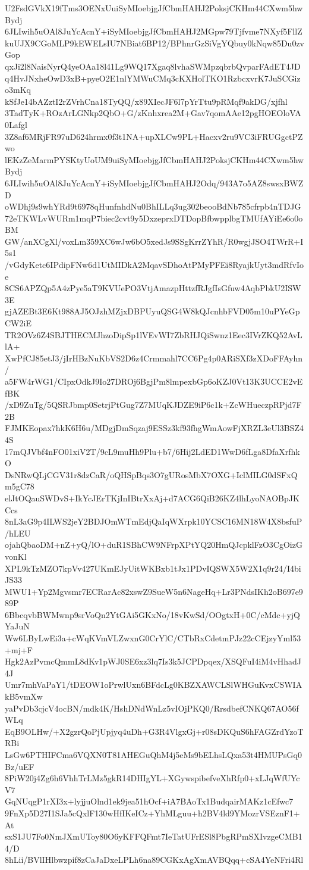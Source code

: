 U2FsdGVkX19fTms3OENxUuiSyMIoebjgJfCbmHAHJ2PoksjCKHm44CXwm5hwBydj
6JLIwih5uOAl8JuYcAcnY+iSyMIoebjgJfCbmHAHJ2MGpw79Tjfvme7NXyf5FllZ
kuUJX9CGoMLP9kEWELsIU7NBiat6BP12/BPhnrGzSiVgYQbuy0kNqw85Du0zvGop
qxJi2l8NaisNyrQ4yeOAa18l41Lg9WQ17Xgaq8lvhaSWMpzqbrbQvparFAdET4JD
q4HvJNxheOwD3xB+pyeO2E1nlYMWuCMq3cKXHolTKO1RzbcxvrK7JuSCGizo3mKq
kSfJe14bAZztI2rZVrhCna18TyQQ/x89XIecJF6l7pYrTtu9pRMqf9akDG/xjfhl
3TadTyK+ROzArLGNkp2QbO+G/zKnhxrea2M+Gav7qomAAe12pgHOEOloVA0Lafgl
3Z8af6MRjFR97uD624hrmx0f3t1NA+upXLCw9PL+Hacxv2ru9VC3iFRUGgctPZwo
lEKzZeMarmPYSKtyUoUM9uiSyMIoebjgJfCbmHAHJ2PoksjCKHm44CXwm5hwBydj
6JLIwih5uOAl8JuYcAcnY+iSyMIoebjgJfCbmHAHJ2Odq/943A7o5AZ8swsxBWZD
oWDhj9s9whYRd9t6978qHunfnhdNu0BhILLq3ug302beooBdNb785cfrpb4nTDJG
72eTKWLvWURm1mqP7biec2cvt9y5DxzeprxDTDopBfbwpplbgTMUfAYiEe6o0oBM
GW/anXCgXl/voxLm359XC6wJw6bO5xedJs9SSgKrrZYhR/R0wgjJSO4TWrR+I5s1
/vGdyKetc6IPdipFNw6d1UtMIDkA2MqavSDhoAtPMyPFEi8RyajkUyt3mdRfvIoe
8CS6APZQp5A4zPye5aT9KVUePO3VtjAmazpHttzfRJgfIsGfuw4AqbPbkU2ISW3E
gjAZEBt3E6Kt988AJ5OJzhMZjxDBPUyuQSG4W8kQJcnhbFVD05m10uPYeGpCW2iE
TR2OVz6Z4SBJTHECMJhzoDipSp1lVEvWI7ZbRHJQiSwnz1Eec3IVrZKQ52AvLlA+
XwPfCJ85etJ3/jIrHBzNuKbVS2D6z4Crmmahl7CC6Pg4p0ARiSXf3zXDoFFAyhn/
a5FW4rWG1/CIpxOdkJ9Io27DROj6BgjPm8lmpexbGp6oKZJ0Vt13K3UCCE2vEfBK
/xD9ZuTg/5QSRJbmp0SetrjPtGug7Z7MUqKJDZE9iP6c1k+ZcWHueczpRPjd7F2B
FJMKEopax7hkK6H6u/MDgjDmSqzaj9ESSz3kf93fhgWmAowFjXRZL3eUl3BSZ44S
17mQJVbf4nFO01xiV2T/9cL9muHh9Plu+b7/6Hij2LdED1WwD6fLga8DfaXrfhkO
DsNRwQLjCGV31r8dzCaR/oQHSpBqs3O7gURosMbX7OXG+IclMILG0dSFxQm5gC78
elJtOQauSWDvS+IkYcJErTKjInIBtrXxAj+d7ACG6QiB26KZ4lhLyoNAOBpJKCcs
8nL3aG9p4ILWS2jeY2BDJOmWTmEdjQaIqWXrpk10YCSC16MN18W4X8bsfuP/hLEU
ojahQbaoDM+nZ+yQ/lO+duR1SBhCW9NFrpXPtYQ20HmQJcpklFzO3CgOizGvonKl
XPL9kTzMZO7kpVv427UKmEJyUitWKBxb1tJx1PDvIQSWX5W2X1q9r24/I4biJS33
MWU1+Yp2Mgvsmr7ECRarAc82xswZ9SueW5n6NageHq+Lr3PNdsIKh2oB697e989P
6BbcqvbBWMwnp9srVoQn2YtGAi5GKxNo/18vKwSd/OOgtxH+0C/cMdc+yjQYaJuN
Ww6LByLwEi3a+cWqKVmVLZwxnG0CrYlC/CTbRxCdetmPJz22cCEjzyYml53+mj+F
Hgk2AzPvmcQmmL8dKv1pWJ0SE6xz3lq7Is3k5JCPDpqex/XSQFuI4iM4vHhadJ4J
Umr7mhVaPaY1/tDEOW1oPrwlUxn6BFdcLg0KBZXAWCLSlWHGuKvxCSWIAkB5vmXw
yaPvDb3cjcV4ocBN/mdk4K/HshDNdWnLz5vIOjPKQ0/RrsdbefCNKQ67AO56fWLq
EqB9OLHw/+X2gzrQoPjUpjyq4uDh+G3R4VlgxGj+r08sDKQuS6hFAGZrdYzoTRBi
LsGw6PTHIFCma6VQXN0T81AHEGuQhM4j5eMs9bELhsLQxa53t4HMUPsGq0Bz/uEF
8PiW20j4Zg6h6VhhTrLMz5gkR14DHIgYL+XGywspibefveXhRfp0+xLJqWfUYcV7
GqNUqgP1rXI3x+lyjjuOlnd1ek9jea51hOcf+iA7BAoTx1BudqairMAKz1cEfwc7
9FnXp5D27I1SJa5cQxlF130wHfIKeICz+YhMLguu+h2BV4ld9YMozrVSEznF1+At
sxS1JU7Fo0NmJXmUToy80O6yKFFQFmt7IeTatUFrESl8PbgRPmSXIvzgeCMB14/D
8hLii/BVlIHlbwzpif8zCaJaDxeLPLh6na89CGKxAgXmAVBQqq+cSA4YeNFri4Rl
